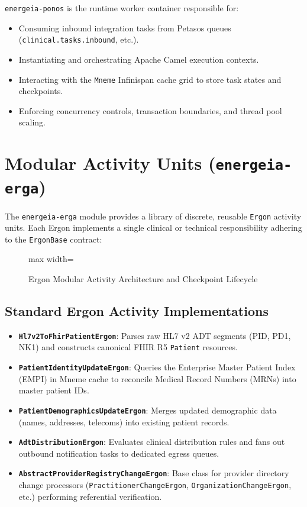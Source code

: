 \texttt{energeia-ponos} is the runtime worker container responsible for:
\begin{itemize}
    \item Consuming inbound integration tasks from Petasos queues (\texttt{clinical.tasks.inbound}, etc.).
    \item Instantiating and orchestrating Apache Camel execution contexts.
    \item Interacting with the \texttt{Mneme} Infinispan cache grid to store task states and checkpoints.
    \item Enforcing concurrency controls, transaction boundaries, and thread pool scaling.
\end{itemize}

\section{Modular Activity Units (\texttt{energeia-erga})}

The \texttt{energeia-erga} module provides a library of discrete, reusable \texttt{Ergon} activity units. Each Ergon implements a single clinical or technical responsibility adhering to the \texttt{ErgonBase} contract:

\begin{figure}[htbp]
    \centering
    \begin{adjustbox}{max width=\textwidth}
        
    \end{adjustbox}
    \caption{Ergon Modular Activity Architecture and Checkpoint Lifecycle}
    \label{fig:energeia_ergon_architecture}
\end{figure}

\subsection{Standard Ergon Activity Implementations}
\begin{itemize}
    \item \textbf{\texttt{Hl7v2ToFhirPatientErgon}}: Parses raw HL7 v2 ADT segments (PID, PD1, NK1) and constructs canonical FHIR R5 \texttt{Patient} resources.
    \item \textbf{\texttt{PatientIdentityUpdateErgon}}: Queries the Enterprise Master Patient Index (EMPI) in Mneme cache to reconcile Medical Record Numbers (MRNs) into master patient IDs.
    \item \textbf{\texttt{PatientDemographicsUpdateErgon}}: Merges updated demographic data (names, addresses, telecoms) into existing patient records.
    \item \textbf{\texttt{AdtDistributionErgon}}: Evaluates clinical distribution rules and fans out outbound notification tasks to dedicated egress queues.
    \item \textbf{\texttt{AbstractProviderRegistryChangeErgon}}: Base class for provider directory change processors (\texttt{PractitionerChangeErgon}, \texttt{OrganizationChangeErgon}, etc.) performing referential verification.
\end{itemize}

